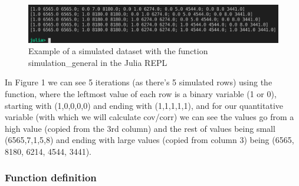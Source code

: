 \documentclass[]{article}
\begin{document}
\begin{figure}
\centering
\includegraphics{julia_output.png}
\caption{Example of a simulated dataset with the function
simulation\_general in the Julia REPL}
\end{figure}

In Figure 1 we can see 5 iterations (as there's 5 simulated rows) using
the function, where the leftmost value of each row is a binary variable
(1 or 0), starting with (1,0,0,0,0) and ending with (1,1,1,1,1), and for
our quantitative variable (with which we will calculate cov/corr) we can
see the values go from a high value (copied from the 3rd column) and the
rest of values being small (6565,7,1,5,8) and ending with large values
(copied from column 3) being (6565, 8180, 6214, 4544, 3441).

\hypertarget{function-definition}{%
\subsubsection{Function definition}\label{function-definition}}
\end{document}
